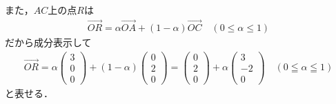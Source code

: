 \documentclass[../../main.tex]{subfiles}
\begin{document}
また，$AC$上の点$R$は
\begin{align}
  \overrightarrow{OR} = \alpha \overrightarrow{OA}+(1-\alpha)\overrightarrow{OC} \quad (0 \le \alpha \le 1)
\end{align}
だから成分表示して
\begin{align}
  \overrightarrow{OR}=\alpha
  \begin{pmatrix}3\\0\\0
  \end{pmatrix}
  +(1-\alpha)
  \begin{pmatrix}0\\2\\0
  \end{pmatrix}
  =
  \begin{pmatrix}0\\2\\0
  \end{pmatrix}+\alpha
  \begin{pmatrix}3\\-2\\0
  \end{pmatrix}
  \quad(0\leqq\alpha\leqq1) \label{eq:3}
\end{align}
と表せる．
\end{document}
